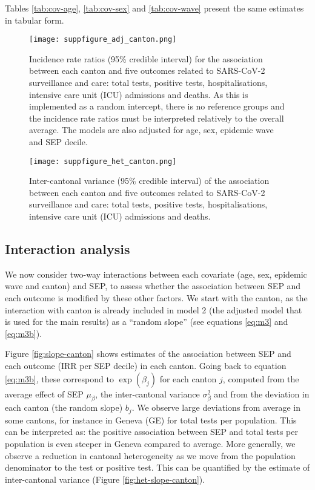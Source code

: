 \documentclass{article}
\begin{document}
Tables \ref{tab:cov-age}, \ref{tab:cov-sex} and \ref{tab:cov-wave} present the same estimates in tabular form.

\begin{figure}[H]
	\centering
	\texttt{[image: suppfigure\_adj\_canton.png]}
	\caption{Incidence rate ratios (95\% credible interval) for the association between each canton and five outcomes related to SARS-CoV-2 surveillance and care: total tests, positive tests, hospitalisations, intensive care unit (ICU) admissions and deaths.
	As this is implemented as a random intercept, there is no reference groups and the incidence rate ratios must be interpreted relatively to the overall average. The models are also adjusted for age, sex, epidemic wave and SEP decile.}
	\label{fig:adj-canton}
\end{figure}


\begin{figure}[H]
	\centering
	\texttt{[image: suppfigure\_het\_canton.png]}
	\caption{Inter-cantonal variance (95\% credible interval) of the association between each canton and five outcomes related to SARS-CoV-2 surveillance and care: total tests, positive tests, hospitalisations, intensive care unit (ICU) admissions and deaths.}
	\label{fig:het-canton}
\end{figure}

	
	\subsection{Interaction analysis}
	\label{sec:int}
	
	We now consider two-way interactions between each covariate (age, sex, epidemic wave and canton) and SEP, to assess whether the association between SEP and each outcome is modified by these other factors.
	We start with the canton, as the interaction with canton is already included in model 2 (the adjusted model that is used for the main results) as a ``random slope'' (see equations \ref{eq:m3} and \ref{eq:m3b}).
	
	Figure \ref{fig:slope-canton} shows estimates of the association between SEP and each outcome (IRR per SEP decile) in each canton. 
	Going back to equation \ref{eq:m3b}, these correspond to $\exp(\beta_j)$ for each canton $j$, computed from the average effect of SEP $\mu_{\beta}$, the inter-cantonal variance $\sigma_{\beta}^2$ and from the deviation in each canton (the random slope) $b_j$.
	We observe large deviations from average in some cantons, for instance in Geneva (GE) for total tests per population. 
	This can be interpreted as: the positive association between SEP and total tests per population is even steeper in Geneva compared to average.
	More generally, we observe a reduction in cantonal heterogeneity as we move from the population denominator to the test or positive test.
	This can be quantified by the estimate of inter-cantonal variance (Figure \ref{fig:het-slope-canton}).
	
\end{document}
